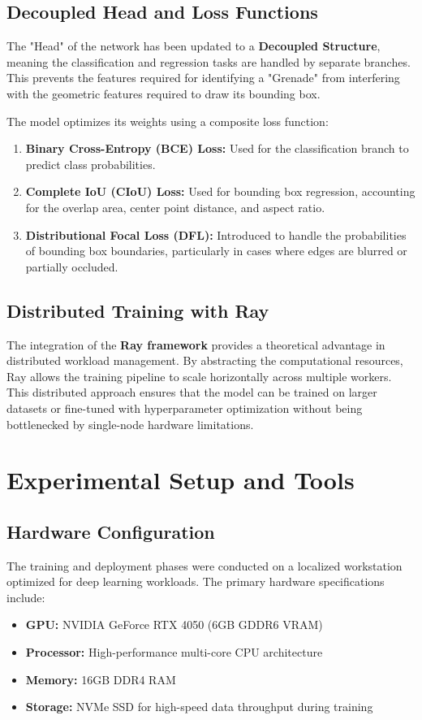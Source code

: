 \documentclass[12pt, a4paper]{report}
\begin{document}
\section{Decoupled Head and Loss Functions}
The "Head" of the network has been updated to a \textbf{Decoupled Structure}, meaning the classification and regression tasks are handled by separate branches. This prevents the features required for identifying a "Grenade" from interfering with the geometric features required to draw its bounding box.

The model optimizes its weights using a composite loss function:
\begin{enumerate}
    \item \textbf{Binary Cross-Entropy (BCE) Loss:} Used for the classification branch to predict class probabilities.
    \item \textbf{Complete IoU (CIoU) Loss:} Used for bounding box regression, accounting for the overlap area, center point distance, and aspect ratio.
    \item \textbf{Distributional Focal Loss (DFL):} Introduced to handle the probabilities of bounding box boundaries, particularly in cases where edges are blurred or partially occluded.
\end{enumerate}

\section{Distributed Training with Ray}
The integration of the \textbf{Ray framework} provides a theoretical advantage in distributed workload management. By abstracting the computational resources, Ray allows the training pipeline to scale horizontally across multiple workers. This distributed approach ensures that the model can be trained on larger datasets or fine-tuned with hyperparameter optimization without being bottlenecked by single-node hardware limitations.

\chapter{Experimental Setup and Tools}

\section{Hardware Configuration}
The training and deployment phases were conducted on a localized workstation optimized for deep learning workloads. The primary hardware specifications include:
\begin{itemize}
    \item \textbf{GPU:} NVIDIA GeForce RTX 4050 (6GB GDDR6 VRAM)
    \item \textbf{Processor:} High-performance multi-core CPU architecture
    \item \textbf{Memory:} 16GB DDR4 RAM
    \item \textbf{Storage:} NVMe SSD for high-speed data throughput during training
\end{itemize}
\end{document}
